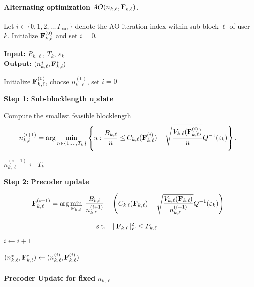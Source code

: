 \documentclass[a4paper, 12pt, onecolumn, journal, twoside, draftclsnofoot]{IEEEtran}
\begin{document}
\paragraph*{Alternating optimization $AO (n_{k,\ell},{\bf F}_{k, \ell})$.}
Let $i\in\{0,1,2,\dots\, I_{\max}\}$ denote the AO iteration index within sub-block $\ell$ of user $k$.
Initialize ${\bf F}_{k, \ell}^{(0)}$ and set $i=0$.
\begin{algorithm}[H]
\caption{Alternating Optimization for $AO(B_{k, \ell}, T_k, \epsilon_k)$}
\textbf{Input:} $B_{k,\ell},\,T_k,\,\varepsilon_k$ \\
\textbf{Output:} $(n^*_{k,\ell},{\bf F}^*_{k,\ell})$
\begin{algorithmic}[1]

\State Initialize ${\bf F}_{k, \ell}^{(0)}$, choose $n_{k,\ell}^{(0)}$, set $i=0$


\State \textbf{Step 1: Sub-blocklength update}

\State Compute the smallest feasible blocklength
\begin{equation*}
n_{k,\ell}^{(i+1)}
=
\arg \min_{n\in\{1,\dots,T_k\}}
\left\{
n :
\frac{B_{k,\ell}}{n}
\le
C_{k,\ell}({\bf F}_{k, \ell}^{(i)})
-
\sqrt{\frac{V_{k,\ell}({\bf F}_{k, \ell}^{(i)})}{n}}
Q^{-1}(\varepsilon_k)
\right\}.
\end{equation*}

\State $n_{k,\ell}^{(i+1)} \gets T_k$
\EndIf



\State \textbf{Step 2: Precoder update}

\begin{equation*}
{\bf F}_{k, \ell}^{(i+1)} =
\arg\min_{{\bf F}_{k, \ell}}
\;
\frac{B_{k,\ell}}{n_{k,\ell}^{(i+1)}} -
\left(
C_{k,\ell}({\bf F}_{k, \ell})
-
\sqrt{\frac{V_{k,\ell}({\bf F}_{k, \ell})}{n_{k,\ell}^{(i+1)}}}
Q^{-1}(\varepsilon_k)
\right)
\end{equation*}

\begin{equation*}
\text{s.t.}\quad
\|{\bf F}_{k, \ell}\|_F^2 \le P_{k,\ell}.
\end{equation*}
\State $i \gets i+1$

\EndWhile

\State $(n^*_{k,\ell},{\bf F}^*_{k,\ell}) \gets (n_{k,\ell}^{(i)},{\bf F}_{k, \ell}^{(i)})$

\end{algorithmic}
\end{algorithm}
\paragraph*{Precoder Update for fixed $n_{k,\ell}$ }
\end{document}
